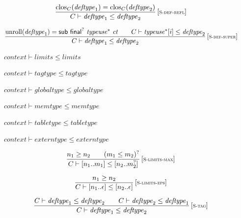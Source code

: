 $$
\begin{array}{@{}c@{}}\displaystyle
\frac{
{{\mathrm{clos}}}_{C}({\mathit{deftype}}_1) = {{\mathrm{clos}}}_{C}({\mathit{deftype}}_2)
}{
C \vdash {\mathit{deftype}}_1 \leq {\mathit{deftype}}_2
} \, {[\textsc{\scriptsize S{-}def{-}refl}]}
\qquad
\end{array}
$$

$$
\begin{array}{@{}c@{}}\displaystyle
\frac{
{\mathrm{unroll}}({\mathit{deftype}}_1) = \mathsf{sub}~{\mathsf{final}^?}~{{\mathit{typeuse}}^\ast}~{\mathit{ct}}
 \qquad
C \vdash {{\mathit{typeuse}}^\ast}{}[i] \leq {\mathit{deftype}}_2
}{
C \vdash {\mathit{deftype}}_1 \leq {\mathit{deftype}}_2
} \, {[\textsc{\scriptsize S{-}def{-}super}]}
\qquad
\end{array}
$$

\vspace{1ex}

$\boxed{{\mathit{context}} \vdash {\mathit{limits}} \leq {\mathit{limits}}}$

$\boxed{{\mathit{context}} \vdash {\mathit{tagtype}} \leq {\mathit{tagtype}}}$

$\boxed{{\mathit{context}} \vdash {\mathit{globaltype}} \leq {\mathit{globaltype}}}$

$\boxed{{\mathit{context}} \vdash {\mathit{memtype}} \leq {\mathit{memtype}}}$

$\boxed{{\mathit{context}} \vdash {\mathit{tabletype}} \leq {\mathit{tabletype}}}$

$\boxed{{\mathit{context}} \vdash {\mathit{externtype}} \leq {\mathit{externtype}}}$

\vspace{1ex}

$$
\begin{array}{@{}c@{}}\displaystyle
\frac{
n_1 \geq n_2
 \qquad
(m_1 \leq m_2)^?
}{
C \vdash {}[ n_1 .. m_1 ] \leq {}[ n_2 .. {m_2^?} ]
} \, {[\textsc{\scriptsize S{-}limits{-}max}]}
\qquad
\end{array}
$$

$$
\begin{array}{@{}c@{}}\displaystyle
\frac{
n_1 \geq n_2
}{
C \vdash {}[ n_1 .. \epsilon ] \leq {}[ n_2 .. \epsilon ]
} \, {[\textsc{\scriptsize S{-}limits{-}eps}]}
\qquad
\end{array}
$$

\vspace{1ex}

$$
\begin{array}{@{}c@{}}\displaystyle
\frac{
C \vdash {\mathit{deftype}}_1 \leq {\mathit{deftype}}_2
 \qquad
C \vdash {\mathit{deftype}}_2 \leq {\mathit{deftype}}_1
}{
C \vdash {\mathit{deftype}}_1 \leq {\mathit{deftype}}_2
} \, {[\textsc{\scriptsize S{-}tag}]}
\qquad
\end{array}
$$

